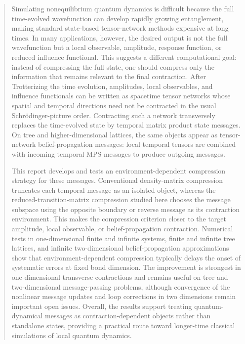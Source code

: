 \documentclass[12pt]{article}
\begin{document}
\begin{abstract}
\noindent
Simulating nonequilibrium quantum dynamics is difficult because the full time-evolved wavefunction can develop rapidly growing entanglement, making standard state-based tensor-network methods expensive at long times.
In many applications, however, the desired output is not the full wavefunction but a local observable, amplitude, response function, or reduced influence functional.
This suggests a different computational goal: instead of compressing the full state, one should compress only the information that remains relevant to the final contraction.
After Trotterizing the time evolution, amplitudes, local observables, and influence functionals can be written as spacetime tensor networks whose spatial and temporal directions need not be contracted in the usual Schrödinger-picture order.
Contracting such a network transversely replaces the time-evolved state by temporal matrix product state messages.
On tree and higher-dimensional lattices, the same objects appear as tensor-network belief-propagation messages: local temporal tensors are combined with incoming temporal MPS messages to produce outgoing messages.

This report develops and tests an environment-dependent compression strategy for these messages.
Conventional density-matrix compression truncates each temporal message as an isolated object, whereas the reduced-transition-matrix compression studied here chooses the message subspace using the opposite boundary or reverse message as its contraction environment.
This makes the compression criterion closer to the target amplitude, local observable, or belief-propagation contraction.
Numerical tests in one-dimensional finite and infinite systems, finite and infinite tree lattices, and infinite two-dimensional belief-propagation approximations show that environment-dependent compression typically delays the onset of systematic errors at fixed bond dimension.
The improvement is strongest in one-dimensional transverse contractions and remains useful on tree and two-dimensional message-passing problems, although convergence of the nonlinear message updates and loop corrections in two dimensions remain important open issues.
Overall, the results support treating quantum-dynamical messages as contraction-dependent objects rather than standalone states, providing a practical route toward longer-time classical simulations of local quantum dynamics.
\end{abstract}
\newpage

\setcounter{page}{1}
\end{document}
